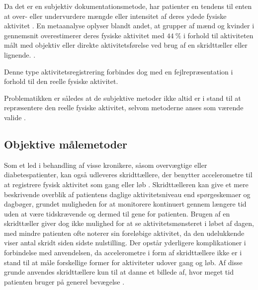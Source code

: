 Da det er en subjektiv dokumentationsmetode, har patienter en tendens til enten at over- eller undervurdere mængde eller intensitet af deres ydede fysiske aktivitet \citep{adamo2009}. 
En metaanalyse oplyser blandt andet, at grupper af mænd og kvinder i gennemsnit overestimerer deres fysiske aktivitet med $44~\%$ i forhold til aktiviteten målt med objektiv eller direkte aktivitetsførelse ved brug af en skridttæller eller lignende. \citep{prince2008}.

Denne type aktivitetsregistrering forbindes dog med en fejlrepræsentation i forhold til den reelle fysiske aktivitet. 

Problematikken er således at de subjektive metoder ikke altid er i stand til at repræsentere den reelle fysiske aktivitet, selvom metoderne anses som værende valide \citep{pedersen2011, motionsraad2007}. 

\subsection{Objektive målemetoder}

Som et led i behandling af visse kronikere, såsom overvægtige eller diabetespatienter, kan også udleveres skridttællere, der benytter accelerometre til at registrere fysisk aktivitet som gang eller løb \citep{muller2009, jensen2012, snorgaard2010}. 
Skridttælleren kan give et mere beskrivende overblik af patientens daglige aktivitetsniveau end spørgeskemaer og dagbøger, grundet muligheden for at monitorere kontinuert gennem længere tid uden at være tidskrævende og dermed til gene for patienten. Brugen af en skridttæller giver dog ikke mulighed for at se aktivitetsmønsteret i løbet af dagen, med mindre patienten ofte noterer sin foreløbige aktivitet, da den udelukkende viser antal skridt siden sidste nulstilling.  
Der opstår yderligere komplikationer i forbindelse med anvendelsen, da accelerometre i form af skridttællere ikke er i stand til at måle forskellige former for aktiviteter udover gang og løb. 
Af disse grunde anvendes skridttællere kun til at danne et billede af, hvor meget tid patienten bruger på generel bevægelse  \citep{motionsraad2007}.